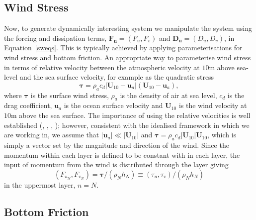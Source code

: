 \documentclass[12pt,a4paper]{report}
\newcommand*\equref[1]{Equation~\eqref{#1}}
\begin{document}
  
  \subsection{Wind Stress}
    
  Now, to generate dynamically interesting system we manipulate the system using 
  the forcing and
  dissipation terms, $\boldsymbol{F}_{\boldsymbol{u}} = \left(F_{u}, F_{v}\right)$ and $\boldsymbol{D}_{\boldsymbol{u}} = \left(D_{u}, D_{v}\right)$, in \equref{sweqs}.
  This is typically achieved by applying parameterisations for wind stress
  and bottom friction. An appropriate way to parameterise wind stress in terms of  
  relative velocity between the atmospheric velocity at $10 \mathrm{m}$ above sea-level
  and the sea surface velocity, for example as the quadratic stress
  \begin{equation}
  \boldsymbol{\tau}=\rho_{a} c_{d} \left|\boldsymbol{U}_{10}-\boldsymbol{u}_{a}\right|
  \left(\boldsymbol{U}_{10}-\boldsymbol{u}_{a}\right),
  \end{equation}
  where $\boldsymbol{\tau}$ is the surface wind stress, $\rho_{a}$ is the density of
  air at sea level, $c_{d}$ is the drag coefficient, $\boldsymbol{u}_{a}$ is the ocean
  surface velocity and $\boldsymbol{U}_{10}$ is the wind velocity
  at $10 \mathrm{m}$ above the sea surface.
 The importance of using the relative velocities is well established
  (\cite{duhaut2006wind}, \cite{zhai2007wind}, \cite{hughes2008wind}, \cite{zhai2012wind}); 
  however, consistent with the idealised framework in which we are 
  working in, we assume that $\left|\boldsymbol{u}_{a}\right| \ll \left|\boldsymbol{U}_{10}\right|$
  and $\boldsymbol{\tau}=\rho_{a} c_{d} \left|\boldsymbol{U}_{10}\right|
  \boldsymbol{U}_{10}$, which is simply a vector set by the 
  magnitude and direction of the wind.
   Since the momentum within each layer
  is defined to be constant with in each layer, the input of momentum from the wind
  is distributed through the layer giving
  \begin{equation*}
  \left(F_{u_{N}},F_{v_{N}}\right)=\boldsymbol{\tau}/\left(\rho_{N}h_{N}\right) \equiv
    \left(\tau_{u},\tau_{v}\right)/\left(\rho_{N}h_{N}\right)
  \end{equation*}  in the
  uppermost layer, $n=N$. 
  
  
  
  \subsection{Bottom Friction}
  
\end{document}

